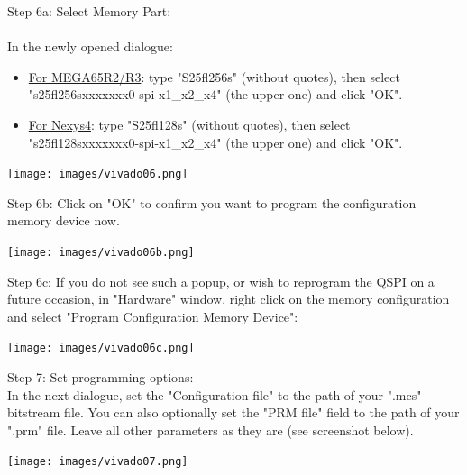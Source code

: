 \vspace{5mm}

\begin{minipage}{\linewidth}
  Step 6a: Select Memory Part: \\
  \\
  In the newly opened dialogue:
  \begin{itemize}
    \item \underline{For MEGA65R2/R3}: type "S25fl256s"
    (without quotes), then select "s25fl256sxxxxxxx0-spi-x1\_x2\_x4"
    (the upper one) and click "OK".
    \item \underline{For Nexys4}: type "S25fl128s"
    (without quotes), then select "s25fl128sxxxxxxx0-spi-x1\_x2\_x4"
    (the upper one) and click "OK".
  \end{itemize}

  \begin{center}
    \texttt{[image: images/vivado06.png]}
  \end{center}
\end{minipage}

\begin{minipage}{\linewidth}
  Step 6b: Click on "OK" to confirm you want to program the configuration memory device now.
  \begin{center}
    \texttt{[image: images/vivado06b.png]}
  \end{center}
\end{minipage}

\begin{minipage}{\linewidth}
  Step 6c: If you do not see such a popup, or wish to reprogram the QSPI on a future occasion, in "Hardware" window, right click on the memory configuration and select "Program Configuration Memory Device":
  \begin{center}
    \texttt{[image: images/vivado06c.png]}
  \end{center}
\end{minipage}

\begin{minipage}{\linewidth}
  Step 7: Set programming options: \\
  In the next dialogue, set the "Configuration file" to the path of your ".mcs" bitstream file. You can also optionally set the "PRM file" field to the path of your ".prm" file. Leave all other parameters
  as they are (see screenshot below).
  \\
  \begin{center}
    \texttt{[image: images/vivado07.png]}
  \end{center}
\end{minipage}

